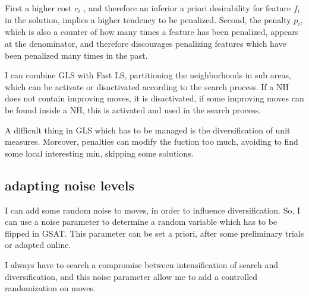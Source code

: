 \documentclass[11pt]{article}
\begin{document}
First a higher cost $ c_i $ , and therefore an inferior a priori desirability for feature $ f_i $ in the solution, implies a higher tendency to be penalized.
Second, the penalty $ p_i $, which is also a counter of how many times a feature has been penalized, appears at the denominator, and therefore discourages penalizing features which have been penalized many times in the past.

I can combine GLS with Fast LS, partitioning the neighborhoods in sub areas, which can be activate or disactivated according to the search process. If a NH does not contain improving moves, it is disactivated, if some improving moves can be found inside a NH, this is activated and used in the search process. 

A difficult thing in GLS which has to be managed is the diversification of unit measures. Moreover, penalties can modify the fuction too much, avoiding to find some local interesting min, skipping some solutions.

\subsection{adapting noise levels}
I can add some random noise to moves, in order to influence diversification. So, I can use a noise parameter to determine a random variable which has to be flipped in GSAT. This parameter can be set a priori, after some preliminary trials or adapted online. 

I always have to search a compromise between intensification of search and diversification, and this noise parameter allow me to add a controlled randomization on moves.
\end{document}
